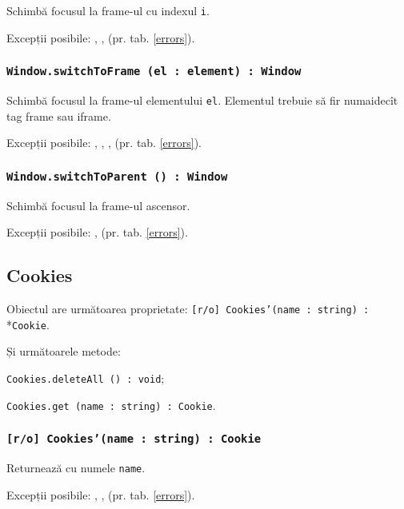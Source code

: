 Schimbă focusul la frame-ul cu indexul \texttt{i}.

Excepții posibile: , ,  (pr. tab. \ref{errors}).

\subsubsection{\texttt{Window.switchToFrame (el : element) : Window}}

Schimbă focusul la frame-ul elementului \texttt{el}. Elementul trebuie să fir numaidecît tag frame sau iframe.

Excepții posibile: , , ,  (pr. tab. \ref{errors}).

\subsubsection{\texttt{Window.switchToParent () : Window}}

Schimbă focusul la frame-ul ascensor.

Excepții posibile: ,  (pr. tab. \ref{errors}).

\subsection{{\color{orange} Cookies}}

Obiectul \cookies{} are următoarea proprietate: \texttt{[r/o] Cookies'(name : string) :} \\*\texttt{Cookie}.

Și următoarele metode: 
\begin{icItems}
	\item \texttt{Cookies.deleteAll () : void};
	\item \texttt{Cookies.get (name : string) : Cookie}.
\end{icItems}

\subsubsection{\texttt{[r/o] Cookies'(name : string) : Cookie}}

Returnează \cookie{} cu numele \texttt{name}.

Excepții posibile: , ,  (pr. tab. \ref{errors}).

